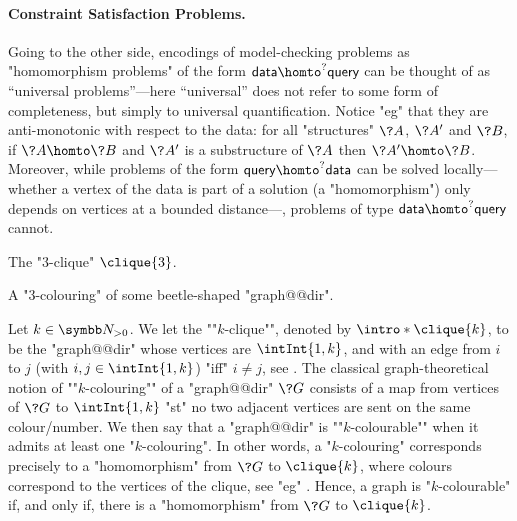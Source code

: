 \paragraph*{Constraint Satisfaction Problems.}
Going to the other side, encodings of model-checking problems
as "homomorphism problems" of the form $\textsf{data} \homto^? \textsf{query}$
can be thought of as ``universal problems''---here ``universal'' does not
refer to some form of completeness, but simply to universal quantification.
Notice "eg" that they are anti-monotonic with respect to the data:
for all "structures" $\?A$, $\?A'$ and $\?B$, if $\?A \homto \?B$ and $\?A'$ is a substructure
of $\?A$ then $\?A' \homto \?B$.
Moreover, while problems of the form $\textsf{query} \homto^? \textsf{data}$
can be solved locally---whether a vertex of the data is part of a solution (a "homomorphism") only 
depends on vertices at a bounded distance---, problems of type $\textsf{data} \homto^? \textsf{query}$ cannot.

\begin{marginfigure}[-18em]
	\centering
	\begin{tikzpicture}
		
	\end{tikzpicture}
	\caption{
		\AP\label{fig:intro-3-clique}
		The "$3$-clique" $\clique{3}$.
	}
\end{marginfigure}
\begin{marginfigure}[-6em]
	\centering
	\begin{tikzpicture}
		
	\end{tikzpicture}
	\caption{
		\AP\label{fig:dichotomy-ex-3-clique}
		A "$3$-colouring" of some beetle-shaped "graph@@dir".
	}
\end{marginfigure}
\begin{example}
	\AP\label{ex:graph-colouring-as-hom}
	Let $k\in\Np$. We let the \AP""$k$-clique"", denoted by $\intro*\clique{k}$,
	to be the "graph@@dir" whose vertices are $\intInt{1,k}$,
	and with an edge from $i$ to $j$ (with $i,j \in \intInt{1,k}$)
	"iff" $i\neq j$, see .
	The classical graph-theoretical notion of \AP""$k$-colouring""
	of a "graph@@dir" $\?G$ consists of
	a map from vertices of $\?G$ to $\intInt{1,k}$
	"st" no two adjacent vertices are sent on the same colour/number.
	We then say that a "graph@@dir" is \AP""$k$-colourable"" when
	it admits at least one "$k$-colouring".
	In other words, a "$k$-colouring" corresponds precisely to a "homomorphism" from $\?G$
	to $\clique{k}$, where colours correspond to the vertices of the clique,
	see "eg" .
	Hence, a graph is "$k$-colourable" if, and only if,
	there is a "homomorphism" from $\?G$ to $\clique{k}$.
\end{example}

